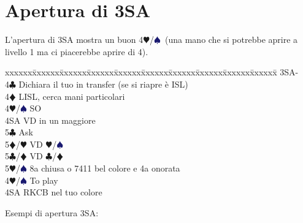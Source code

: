 \documentclass[a4paper,italian]{article}
\newcommand{\BC}{\textcolor{OliveGreen}{$\clubsuit$}}
\newcommand{\BD}{\textcolor{RedOrange}{$\vardiamondsuit$}}
\newcommand{\BH}{\textcolor{Red2}{$\varheartsuit${}}}
\newcommand{\BS}{\textcolor{MidnightBlue}{$\spadesuit${}}}
\newenvironment{bidtable}
{\begin{tabbing}

    xxxxxx\=xxxxxx\=xxxxxx\=xxxxxx\=xxxxxx\=xxxxxx\=xxxxxx\=xxxxxx\=xxxxxx\=xxxxxx\=\kill}
{\end{tabbing} }%
\begin{document}
                                    \section{Apertura di 3SA}
                                    \begin{multicols*}{2}
                                        L'apertura di 3SA mostra un buon 4\BH/\BS\ (una mano che si potrebbe aprire a livello 1 ma ci piacerebbe aprire di 4).
                                        


                                        \begin{bidtable}
                                            3SA-\\
                                            4\BC\> Dichiara il tuo in transfer (se si riapre è ISL)\\
                                            4\BD\> LISL, cerca mani particolari\+\\
                                            4\BH/\BS\> SO\\
                                            4SA\> VD in un maggiore\+\\
                                            5\BC\> Ask\+\\
                                            5\BD/\BH\> VD \BH/\BS\-\-\\
                                            5\BC/\BD\> VD \BC/\BD\\
                                            5\BH/\BS\> 8a chiusa o 7411 bel colore e 4a onorata\-\\
                                            4\BH/\BS\> To play\\
                                            4SA\> RKCB nel tuo colore
                                        \end{bidtable}
                                        \vfill
                                        \parbox{\textwidth}{}
                                        \columnbreak

                                        Esempi di apertura 3SA:
                                        \begin{center}


\end{center}
\end{multicols*}
\end{document}

